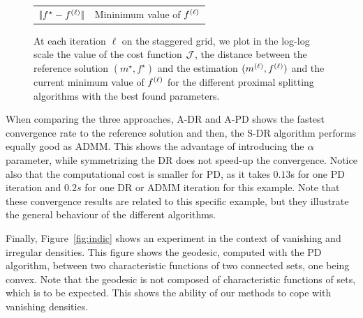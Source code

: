 \begin{figure}[ht]
\begin{center}
\begin{tabular}{cc}
$ |\!| f^\star-{f}^{(\ell)} |\!|$ &\hspace{-0.15cm}Mininimum value of ${f}^{(\ell)}$
\end{tabular}
\caption{\label{fig:comp_bump} 
	At each iteration $\ell$ on the staggered grid, we plot in the log-log scale the value of the cost function $\mathcal{J}$, the distance between the reference solution $(m^\star,f^\star)$ and the estimation $({m}^{(\ell)},{f}^{(\ell)})$ and the current minimum value of ${f}^{(\ell)}$ for the different proximal splitting algorithms with the best found parameters. }
\end{center}
\end{figure}

When comparing the three approaches, A-DR and A-PD shows the fastest convergence rate to the reference solution and then, the S-DR algorithm performs equally good as ADMM. This shows the advantage of introducing the $\alpha$ parameter, while symmetrizing the DR does not speed-up the convergence.  Notice also that the computational cost is smaller for PD, as it takes $0.13$s for one PD iteration and $0.2s$ for one DR or ADMM iteration for this example.  Note that these convergence results are  related to this specific example, but they illustrate the general behaviour of the different algorithms. 



Finally, Figure~\ref{fig:indic} shows an experiment in the context of vanishing and irregular densities.  This figure shows the geodesic, computed with the PD algorithm, between two characteristic functions of two connected sets, one being convex. Note that the geodesic is not composed of characteristic functions of sets, which is to be expected. This shows the ability of our methods to cope with vanishing densities. 



